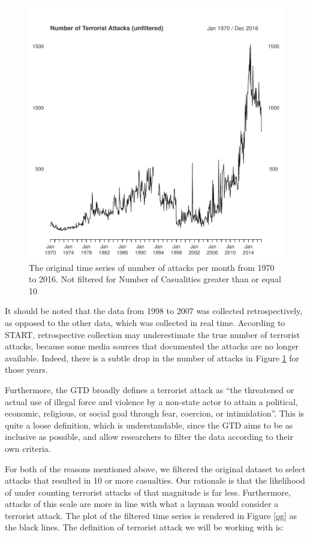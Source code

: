\documentclass[11pt]{paper}
\begin{document}
\begin{figure}
\centering
\includegraphics[width=0.75\linewidth]{../image/og_og_og.pdf}
\caption{The original time series of number of attacks per month from 1970 to 2016. Not filtered for Number of Casualities greater than or equal 10}
\label{ogogog}
\end{figure}

It should be noted that the data from 1998 to 2007 was collected retrospectively, as opposed to the other data, which was collected in real time. According to START, retrospective collection may underestimate the true number of terrorist attacks, because some media sources that documented the attacks are no longer available. Indeed, there is a subtle drop in the number of attacks in Figure \ref{ogogog} for those years.

Furthermore, the GTD broadly defines a terrorist attack as ``the threatened or actual use of illegal force and violence by a non-state actor to attain a political, economic, religious, or social goal through fear, coercion, or intimidation''. This is quite a loose definition, which is understandable, since the GTD aims to be as inclusive as possible, and allow researchers to filter the data according to their own criteria.

For both of the reasons mentioned above, we filtered the original dataset to select attacks that resulted in 10 or more casualties. Our rationale is that the likelihood of under counting terrorist attacks of that magnitude is far less. Furthermore, attacks of this scale are more in line with what a layman would consider a terrorist attack. The plot of the filtered time series is rendered in Figure \ref{og} as the black lines. The definition of terrorist attack we will be working with is:
\end{document}
